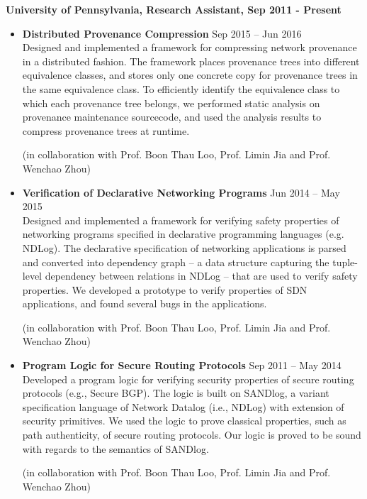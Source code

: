 {\bf University of Pennsylvania, Research Assistant, Sep 2011 -
  Present}

\begin{itemize}
\item {\bf Distributed Provenance Compression} \hfill Sep 2015 -- Jun
  2016\\ Designed and implemented a framework for compressing network
  provenance in a distributed fashion. The framework places provenance
  trees into different equivalence classes, and stores only one
  concrete copy for provenance trees in the same equivalence class. To
  efficiently identify the equivalence class to which each provenance tree
  belongs, we performed static analysis on provenance maintenance
  sourcecode, and used the analysis results to compress provenance
  trees at runtime.


(in collaboration with Prof. Boon Thau Loo, Prof. Limin Jia and Prof. Wenchao Zhou)
\item {\bf Verification of Declarative Networking Programs} \hfill Jun
  2014 -- May 2015\\ Designed and implemented a framework for
  verifying safety properties of networking programs specified in
  declarative programming languages (e.g. NDLog). The declarative
  specification of networking applications is parsed and converted
  into dependency graph -- a data structure capturing the tuple-level
  dependency between relations in NDLog -- that are used to verify
  safety properties.
  We developed a prototype to verify
  properties of SDN applications, and found several bugs in the
  applications.


(in collaboration with Prof. Boon Thau Loo, Prof. Limin Jia and Prof. Wenchao Zhou)
\item {\bf Program Logic for Secure Routing Protocols} \hfill Sep 2011
  -- May 2014\\ Developed a program logic for verifying security
  properties of secure routing protocols (e.g., Secure BGP). The logic
  is built on SANDlog, a variant specification language of Network
  Datalog (i.e., NDLog) with extension of security primitives. We used
  the logic to prove classical properties, such as path authenticity,
  of secure routing protocols. Our logic is proved to be sound with
  regards to the semantics of SANDlog.


(in collaboration with Prof. Boon Thau Loo, Prof. Limin Jia and Prof. Wenchao Zhou)
\end{itemize}
